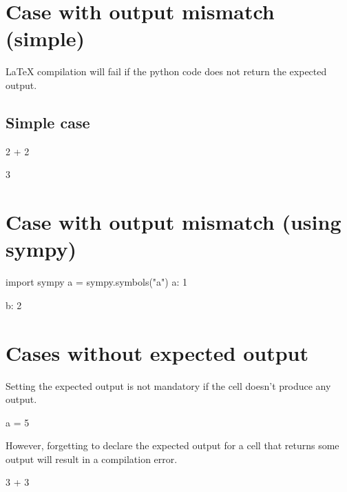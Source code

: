 \documentclass[oneside]{book}
\begin{document}
\chapter{Case with output mismatch (simple)}

LaTeX compilation will fail if the python code does not return the expected output.

\section{Simple case}

\begin{pycell}
2 + 2
\end{pycell}
\begin{pyexpectedoutput}
3
\end{pyexpectedoutput}

\chapter{Case with output mismatch (using sympy)}

\begin{pycell}
import sympy
a = sympy.symbols("a")
{a: 1}
\end{pycell}
\begin{pyexpectedoutput}
{b: 2}
\end{pyexpectedoutput}

\chapter{Cases without expected output}

Setting the expected output is not mandatory if the cell doesn't produce any output.

\begin{pycell}
a = 5
\end{pycell}

However, forgetting to declare the expected output for a cell that returns some output will result in a compilation error.
\begin{pycell}
3 + 3
\end{pycell}

\ifPythonTeXLoaded
\else
\fi
\end{document}
